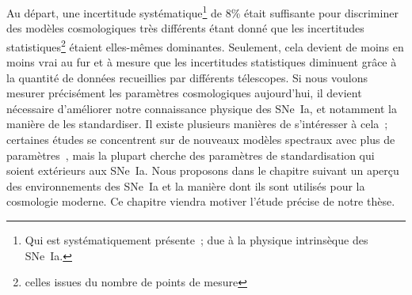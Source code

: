 \documentclass[../main/main.tex]{subfiles}
\begin{document}
Au départ, une incertitude systématique\footnote{Qui est systématiquement
présente~; due à la physique intrinsèque des SNe~Ia.} de 8\% était suffisante
pour discriminer des modèles cosmologiques très différents étant donné que les
incertitudes statistiques\footnote{celles issues du nombre de points de mesure}
étaient elles-mêmes dominantes. Seulement, cela devient de moins en moins vrai
au fur et à mesure que les incertitudes statistiques diminuent grâce à la
quantité de données recueillies par différents télescopes. Si nous voulons
mesurer précisément les paramètres cosmologiques aujourd'hui, il devient
nécessaire d'améliorer notre connaissance physique des SNe~Ia, et notamment la
manière de les standardiser. Il existe plusieurs manières de s'intéresser à
cela~; certaines études se concentrent sur de nouveaux modèles spectraux avec
plus de paramètres~\cite[par exemple][]{leget2020}, mais la plupart cherche des
paramètres de standardisation qui soient extérieurs aux SNe~Ia. Nous proposons
dans le chapitre suivant un aperçu des environnements des SNe~Ia et la manière
dont ils sont utilisés pour la cosmologie moderne. Ce chapitre viendra motiver
l'étude précise de notre thèse.

\newpage

\thispagestyle{plain}
\vfill
\minilof
\vfill
\minilot
\vfill

% 
% 
\end{document}

